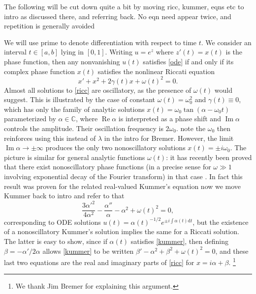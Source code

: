 \documentclass[10pt]{article}
\newcommand{\be}{\begin{equation}}
\newcommand{\ee}{\end{equation}}
\newcommand{\C}{\mathbb{C}}
\renewcommand{\d}{\mathrm{d}} %
\DeclareMathOperator{\im}{Im}
\DeclareMathOperator{\re}{Re}
\newcommand{\om}{\omega}
\newcommand{\g}{\gamma}
\newcommand{\AB}[1]{{\color{orange}#1}}
\begin{document}
\AB{The following will be cut down quite a bit by moving ricc, kummer,
  eqns etc to intro as discussed there, and referring back. No eqn need appear
twice, and repetition is generally avoided}

We will use prime to denote differentiation with respect to time $t$.
We consider an interval $t\in[a,b]$ lying in $[0,1]$.  
Writing $u = e^z$ where $z'(t) = x(t)$ is the phase function,
then any nonvanishing $u(t)$ satisfies \cref{ode} if and only if
its complex phase function $x(t)$ satisfies the nonlinear Riccati equation
\be
x' + x^2 + 2\g(t)x + \om(t)^2 = 0.
\label{ricc}
\ee
Almost all solutions to \cref{ricc} are oscillatory,
as the presence of $\om(t)$ would suggest.
This is illustrated by the case of constant $\om(t) = \om_0^2$
and $\g(t)\equiv0$,
which has only the family of analytic solutions
$x(t) = \om_0 \tan(\alpha - \om_0t)$ parameterized by $\alpha\in\C$,
where $\re \alpha$ is interpreted as a phase shift and $\im \alpha$
controls the amplitude. Their oscillation frequency is $2\om_0$.
\AB{note the $\om_0$ then reinforces using this instead of $\lambda$
  in the intro for Bremer.}
However, the limit $\im \alpha \to \pm \infty$ produces
the only two nonoscillatory solutions $x(t) = \pm i\om_0$.
The picture is similar
for general analytic functions $\om(t)$:
it has recently been proved that there exist nonoscillatory phase functions
(in a precise sense for $\om\gg 1$ involving exponential decay of the Fourier
transform) in that case \cite{heitman2015,bremer2016}.
In fact this result was proven
for the related real-valued Kummer's equation
\AB{now we move Kummer back to intro and refer to that}
\be
\frac{3 \alpha'^2}{4\alpha^2} - \frac{\alpha''}{\alpha} - \alpha^2 +
\om(t)^2 = 0,
\label{kummer}
\ee
corresponding to ODE solutions $u(t) = \alpha(t)^{-1/2} e^{\pm i\int \alpha(t) \d t}$,
but the existence of a nonoscillatory Kummer's solution implies the same for
a Riccati solution.
The latter is easy to show, since if $\alpha(t)$ satisfies \cref{kummer},
then defining $\beta = -\alpha'/2\alpha$ allows \cref{kummer}
to be written
$\beta' - \alpha^2 + \beta^2 + \om(t)^2 = 0$, and these last two equations
are the real and imaginary parts of \cref{ricc}
for $x = i\alpha + \beta$.
\footnote{We thank Jim Bremer for explaining this argument.}
\end{document}
